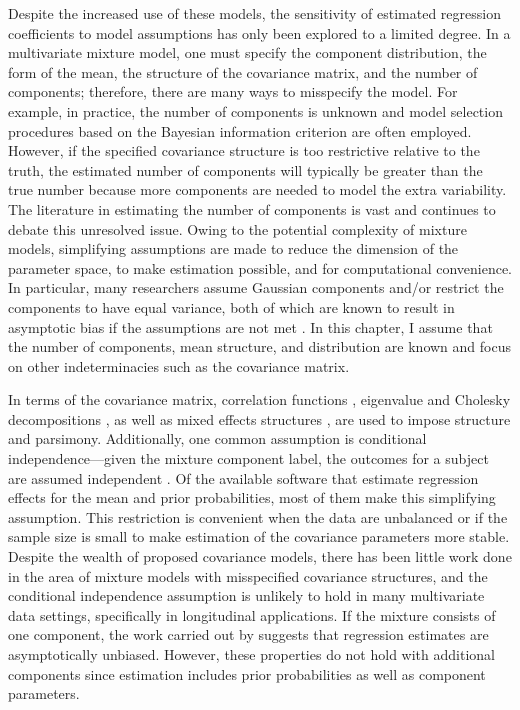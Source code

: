  Despite the increased use of these models, the sensitivity of estimated regression coefficients to model assumptions has only been explored to a limited degree. In a multivariate mixture model, one must specify the component distribution, the form of the mean, the structure of the covariance matrix, and the number of components; therefore, there are many ways to misspecify the model. For example, in practice, the number of components is unknown and model selection procedures based on the Bayesian information criterion are often employed. However, if the specified covariance structure is too restrictive relative to the truth, the estimated number of components will typically be greater than the true number because more components are needed to model the extra variability. The literature in estimating the number of components is  vast \cite{oliveira2005} and continues to debate this unresolved issue. Owing to the potential complexity of mixture models, simplifying assumptions are made to reduce the dimension of the parameter space, to make estimation possible, and for computational convenience. In particular, many researchers assume Gaussian components and/or restrict the components to have equal variance, both of which are known to result in asymptotic bias if the assumptions are not met \cite{gray1994, lo2011}. In this chapter, I assume that the number of components, mean structure, and distribution are known and focus on other indeterminacies such as the covariance matrix.
 
In terms of the covariance matrix, correlation functions \cite{diggle2002}, eigenvalue and Cholesky decompositions \cite{banfield1993,mcnicholas2010}, as well as mixed effects structures \cite{muthen1999}, are used to impose structure and parsimony. Additionally, one common assumption is conditional independence---given the mixture component label, the outcomes for a subject are assumed independent \cite{ostbye2011,muthen2008}. Of the available software that estimate regression effects for the mean and prior probabilities, most of them make this simplifying assumption. This restriction is convenient when the data are unbalanced or if the sample size is small to make estimation of the covariance parameters more stable. Despite the wealth of proposed covariance models, there has been little work done in the area of mixture models with misspecified covariance structures, and the conditional independence assumption is unlikely to hold in many multivariate data settings, specifically in longitudinal applications. If the mixture consists of one component, the work carried out by \textcite{liang1986} suggests that regression estimates are asymptotically unbiased. However, these properties do not hold with additional components since estimation includes prior probabilities as well as component parameters. 


